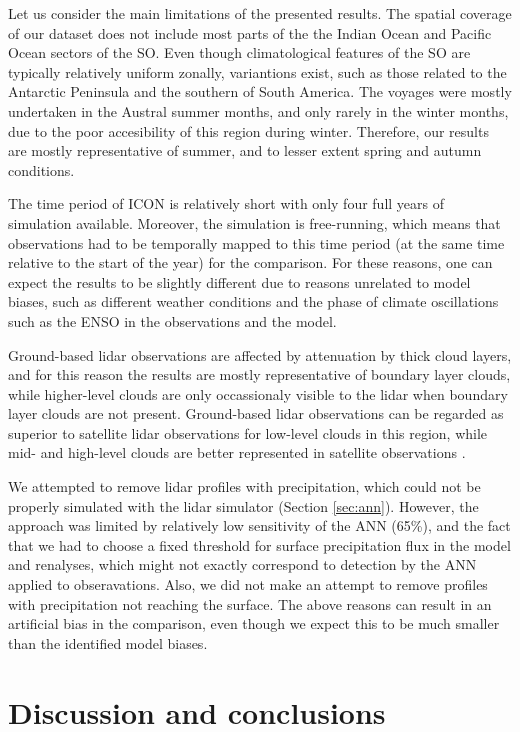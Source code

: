\documentclass[12pt,a4paper]{article}
\begin{document}
Let us consider the main limitations of the presented results. The spatial
coverage of our dataset does not include most parts of the the Indian Ocean and
Pacific Ocean sectors of the SO. Even though climatological features of the SO
are typically relatively uniform zonally, variantions exist, such as those
related to the Antarctic Peninsula and the southern of South America. The
voyages were mostly undertaken in the Austral summer months, and only rarely in
the winter months, due to the poor accesibility of this region during winter.
Therefore, our results are mostly representative of summer, and to lesser
extent spring and autumn conditions.

The time period of ICON is relatively short with only four full years of
simulation available. Moreover, the simulation is free-running, which means
that observations had to be temporally mapped to this time period (at the same
time relative to the start of the year) for the comparison. For these reasons,
one can expect the results to be slightly different due to reasons unrelated to
model biases, such as different weather conditions and the phase of climate
oscillations such as the ENSO in the observations and the model.

Ground-based lidar observations are affected by attenuation by thick cloud
layers, and for this reason the results are mostly representative of boundary
layer clouds, while higher-level clouds are only occassionaly visible to the
lidar when boundary layer clouds are not present. Ground-based lidar
observations can be regarded as superior to satellite lidar observations for
low-level clouds in this region, while mid- and high-level clouds are better
represented in satellite observations \citep{mcerlich2021}.

We attempted to remove lidar profiles with precipitation, which could not be
properly simulated with the lidar simulator (Section \ref{sec:ann}). However,
the approach was limited by relatively low sensitivity of the ANN (65\%), and
the fact that we had to choose a fixed threshold for surface precipitation flux
in the model and renalyses, which might not exactly correspond to detection by
the ANN applied to obseravations. Also, we did not make an attempt to remove
profiles with precipitation not reaching the surface. The above reasons can
result in an artificial bias in the comparison, even though we expect this to
be much smaller than the identified model biases.

\section{Discussion and conclusions}
\end{document}
